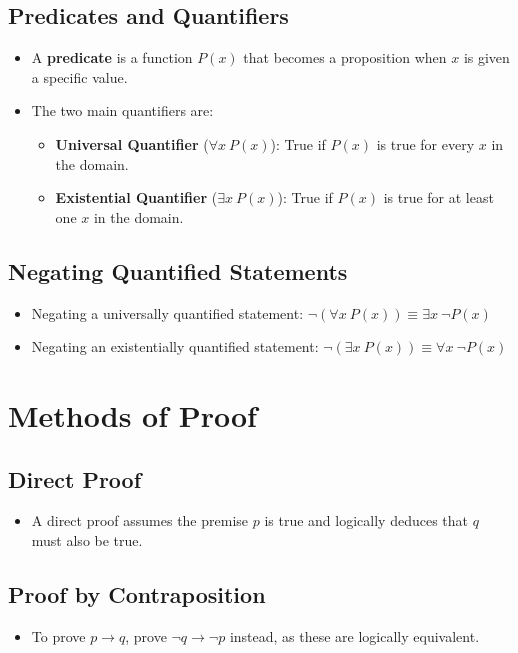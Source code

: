 \documentclass{article}
\begin{document}
\subsection{Predicates and Quantifiers}
\begin{itemize}
    \item A \textbf{predicate} is a function $P(x)$ that becomes a proposition when $x$ is given a specific value.
    \item The two main quantifiers are:
    \begin{itemize}
        \item \textbf{Universal Quantifier} ($\forall x \ P(x)$): True if $P(x)$ is true for every $x$ in the domain.
        \item \textbf{Existential Quantifier} ($\exists x \ P(x)$): True if $P(x)$ is true for at least one $x$ in the domain.
    \end{itemize}
\end{itemize}

\subsection{Negating Quantified Statements}
\begin{itemize}
    \item Negating a universally quantified statement: $\neg (\forall x \ P(x)) \equiv \exists x \ \neg P(x)$
    \item Negating an existentially quantified statement: $\neg (\exists x \ P(x)) \equiv \forall x \ \neg P(x)$
\end{itemize}

\section{Methods of Proof}

\subsection{Direct Proof}
\begin{itemize}
    \item A direct proof assumes the premise $p$ is true and logically deduces that $q$ must also be true.
\end{itemize}

\subsection{Proof by Contraposition}
\begin{itemize}
    \item To prove $p \to q$, prove $\neg q \to \neg p$ instead, as these are logically equivalent.
\end{itemize}
\end{document}
